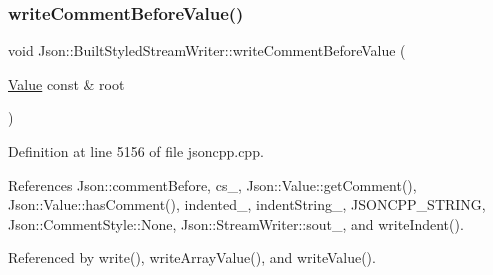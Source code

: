 \subsubsection{\texorpdfstring{write\+Comment\+Before\+Value()}{writeCommentBeforeValue()}}
{\footnotesize\ttfamily void Json\+::\+Built\+Styled\+Stream\+Writer\+::write\+Comment\+Before\+Value (\begin{DoxyParamCaption}\item[{\hyperlink{class_json_1_1_value}{Value} const \&}]{root }\end{DoxyParamCaption})\hspace{0.3cm}{\ttfamily [private]}}



Definition at line 5156 of file jsoncpp.\+cpp.



References Json\+::comment\+Before, cs\+\_\+, Json\+::\+Value\+::get\+Comment(), Json\+::\+Value\+::has\+Comment(), indented\+\_\+, indent\+String\+\_\+, J\+S\+O\+N\+C\+P\+P\+\_\+\+S\+T\+R\+I\+NG, Json\+::\+Comment\+Style\+::\+None, Json\+::\+Stream\+Writer\+::sout\+\_\+, and write\+Indent().



Referenced by write(), write\+Array\+Value(), and write\+Value().


